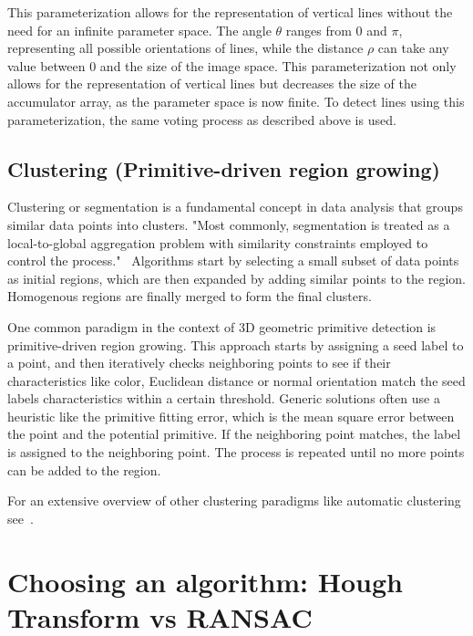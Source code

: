 This parameterization allows for the representation of vertical lines without the need for an infinite parameter space.
The angle $\theta$ ranges from $0$ and $\pi$, representing all possible orientations of lines,
while the distance $\rho$ can take any value between $0$ and the size of the image space.
This parameterization not only allows for the representation of vertical lines
but decreases the size of the accumulator array, as the parameter space is now finite.
To detect lines using this parameterization, the same voting process as described above is used.


\subsection{Clustering (Primitive-driven region growing)}
Clustering or segmentation is a fundamental concept in data analysis that groups similar data points into clusters.
"Most commonly, segmentation is treated as a local-to-global aggregation problem with similarity constraints employed to control the process."~\parencite{lukacs_faithful_1998}
Algorithms start by selecting a small subset of data points as initial regions, which are then expanded by adding similar points to the region.
Homogenous regions are finally merged to form the final clusters.~\parencite{lukacs_faithful_1998}

One common paradigm in the context of 3D geometric primitive detection is primitive-driven region growing.
This approach starts by assigning a seed label to a point, and then iteratively checks neighboring points to see if
their characteristics like color, Euclidean distance or normal orientation match the seed labels characteristics within a certain threshold.
Generic solutions often use a heuristic like the primitive fitting error, which is the mean square error between the point and the potential primitive.
If the neighboring point matches, the label is assigned to the neighboring point.
The process is repeated until no more points can be added to the region.
\cite{kaiser_survey_2019}

For an extensive overview of other clustering paradigms like automatic clustering see~\cite{kaiser_survey_2019}.

\section{Choosing an algorithm: Hough Transform vs RANSAC}\label{sec:choosing-an-algorithm}

